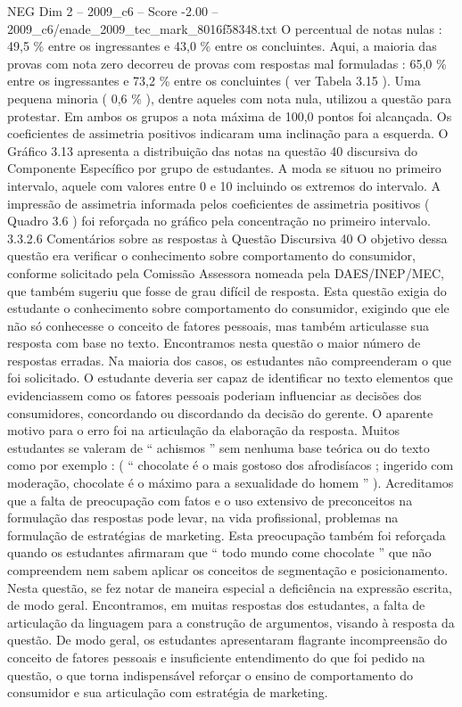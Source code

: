 \begin{textsample}{NEG Dim 2 – 2009\_c6 – Score -2.00 – 2009\_c6/enade\_2009\_tec\_mark\_8016f58348.txt}
O percentual de notas nulas : 49,5 \% entre os ingressantes e 43,0 \% entre os concluintes.
Aqui, a maioria das provas com nota zero decorreu de provas com respostas mal formuladas : 65,0 \% entre os ingressantes e 73,2 \% entre os concluintes ( ver Tabela 3.15 ).
Uma pequena minoria ( 0,6 \% ), dentre aqueles com nota nula, utilizou a questão para protestar.
Em ambos os grupos a nota máxima de 100,0 pontos foi alcançada.
Os coeficientes de assimetria positivos indicaram uma inclinação para a esquerda.
O Gráfico 3.13 apresenta a distribuição das notas na questão 40 discursiva do Componente Específico por grupo de estudantes.
A moda se situou no primeiro intervalo, aquele com valores entre 0 e 10 incluindo os extremos do intervalo.
A impressão de assimetria informada pelos coeficientes de assimetria positivos ( Quadro 3.6 ) foi reforçada no gráfico pela concentração no primeiro intervalo. 3.3.2.6 Comentários sobre as respostas à Questão Discursiva 40 O objetivo dessa questão era verificar o conhecimento sobre comportamento do consumidor, conforme solicitado pela Comissão Assessora nomeada pela DAES/INEP/MEC, que também sugeriu que fosse de grau difícil de resposta.
Esta questão exigia do estudante o conhecimento sobre comportamento do consumidor, exigindo que ele não só conhecesse o conceito de fatores pessoais, mas também articulasse sua resposta com base no texto.
Encontramos nesta questão o maior número de respostas erradas.
Na maioria dos casos, os estudantes não compreenderam o que foi solicitado.
O estudante deveria ser capaz de identificar no texto elementos que evidenciassem como os fatores pessoais poderiam influenciar as decisões dos consumidores, concordando ou discordando da decisão do gerente.
O aparente motivo para o erro foi na articulação da elaboração da resposta.
Muitos estudantes se valeram de “ achismos ” sem nenhuma base teórica ou do texto como por exemplo : ( “ chocolate é o mais gostoso dos afrodisíacos ; ingerido com moderação, chocolate é o máximo para a sexualidade do homem ” ).
Acreditamos que a falta de preocupação com fatos e o uso extensivo de preconceitos na formulação das respostas pode levar, na vida profissional, problemas na formulação de estratégias de marketing.
Esta preocupação também foi reforçada quando os estudantes afirmaram que “ todo mundo come chocolate ” que não compreendem nem sabem aplicar os conceitos de segmentação e posicionamento.
Nesta questão, se fez notar de maneira especial a deficiência na expressão escrita, de modo geral.
Encontramos, em muitas respostas dos estudantes, a falta de articulação da linguagem para a construção de argumentos, visando à resposta da questão.
De modo geral, os estudantes apresentaram flagrante incompreensão do conceito de fatores pessoais e insuficiente entendimento do que foi pedido na questão, o que torna indispensável reforçar o ensino de comportamento do consumidor e sua articulação com estratégia de marketing.

\end{textsample}
